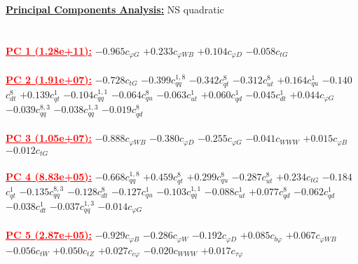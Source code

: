 \documentclass{article}
\begin{document}
\noindent \underline{\bf{Principal Components Analysis}:} NS quadratic\\ \\ \\
\noindent \textcolor{red}{\underline{\bf{PC 1} (1.28e+11):}}
{$-0.965$}{\rm $c_{\varphi G}$} 
{$+0.233$}{\rm $c_{\varphi WB}$} 
{$+0.104$}{\rm $c_{\varphi D}$} 
{$-0.058$}{\rm $c_{tG}$} 
 \nonumber \\ \nonumber \\ 
\noindent \textcolor{red}{\underline{\bf{PC 2} (1.91e+07):}}
{$-0.728$}{\rm $c_{tG}$} 
{$-0.399$}{\rm $c_{qq}^{1,8}$} 
{$-0.342$}{\rm $c_{qt}^{8}$} 
{$-0.312$}{\rm $c_{ut}^{8}$} 
{$+0.164$}{\rm $c_{qu}^{1}$} 
{$-0.140$}{\rm $c_{dt}^{8}$} 
{$+0.139$}{\rm $c_{qt}^{1}$} 
{$-0.104$}{\rm $c_{qq}^{1,1}$} 
{$-0.064$}{\rm $c_{qu}^{8}$} 
{$-0.063$}{\rm $c_{ut}^{1}$} 
{$+0.060$}{\rm $c_{qd}^{1}$} 
{$-0.045$}{\rm $c_{dt}^{1}$} 
{$+0.044$}{\rm $c_{\varphi G}$} 
{$-0.039$}{\rm $c_{qq}^{8,3}$} 
{$-0.038$}{\rm $c_{qq}^{1,3}$} 
{$-0.019$}{\rm $c_{qd}^{8}$} 
 \nonumber \\ \nonumber \\ 
\noindent \textcolor{red}{\underline{\bf{PC 3} (1.05e+07):}}
{$-0.888$}{\rm $c_{\varphi WB}$} 
{$-0.380$}{\rm $c_{\varphi D}$} 
{$-0.255$}{\rm $c_{\varphi G}$} 
{$-0.041$}{\rm $c_{WWW}$} 
{$+0.015$}{\rm $c_{\varphi B}$} 
{$-0.012$}{\rm $c_{tG}$} 
 \nonumber \\ \nonumber \\ 
\noindent \textcolor{red}{\underline{\bf{PC 4} (8.83e+05):}}
{$-0.668$}{\rm $c_{qq}^{1,8}$} 
{$+0.459$}{\rm $c_{qt}^{8}$} 
{$+0.299$}{\rm $c_{qu}^{8}$} 
{$-0.287$}{\rm $c_{ut}^{8}$} 
{$+0.234$}{\rm $c_{tG}$} 
{$-0.184$}{\rm $c_{qt}^{1}$} 
{$-0.135$}{\rm $c_{qq}^{8,3}$} 
{$-0.128$}{\rm $c_{dt}^{8}$} 
{$-0.127$}{\rm $c_{qu}^{1}$} 
{$-0.103$}{\rm $c_{qq}^{1,1}$} 
{$-0.088$}{\rm $c_{ut}^{1}$} 
{$+0.077$}{\rm $c_{qd}^{8}$} 
{$-0.062$}{\rm $c_{qd}^{1}$} 
{$-0.038$}{\rm $c_{dt}^{1}$} 
{$-0.037$}{\rm $c_{qq}^{1,3}$} 
{$-0.014$}{\rm $c_{\varphi G}$} 
 \nonumber \\ \nonumber \\ 
\noindent \textcolor{red}{\underline{\bf{PC 5} (2.87e+05):}}
{$-0.929$}{\rm $c_{\varphi B}$} 
{$-0.286$}{\rm $c_{\varphi W}$} 
{$-0.192$}{\rm $c_{\varphi D}$} 
{$+0.085$}{\rm $c_{b \varphi}$} 
{$+0.067$}{\rm $c_{\varphi WB}$} 
{$-0.056$}{\rm $c_{tW}$} 
{$+0.050$}{\rm $c_{tZ}$} 
{$+0.027$}{\rm $c_{c \varphi}$} 
{$-0.020$}{\rm $c_{WWW}$} 
{$+0.017$}{\rm $c_{\tau \varphi}$} 
 \nonumber \\ \nonumber \\ 
\end{document}

